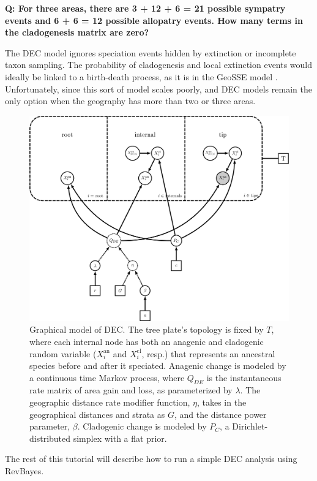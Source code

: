 {\bf Q: For three areas, there are 3 + 12 + 6 = 21 possible sympatry events and 6 + 6 = 12 possible allopatry events. How many terms in the cladogenesis matrix are zero?}

The DEC model ignores speciation events hidden by extinction or incomplete taxon sampling.
The probability of cladogenesis and local extinction events would ideally be linked to a birth-death process, as it is in the GeoSSE model \citep{goldberg11}.
Unfortunately, since this sort of model scales poorly, and DEC models remain the only option when the geography has more than two or three areas.


\begin{figure}[H]
\centering
\includegraphics[width=5in]{figures/bg_dec_dag}
\caption{Graphical model of DEC. The tree plate's topology is fixed by $T$, where each internal node has both an anagenic and cladogenic random variable ($X_i^{\text{an}}$ and $X_i^{\text{cl}}$, resp.) that represents an ancestral species before and after it speciated. Anagenic change is modeled by a continuous time Markov process, where $Q_{DE}$ is the instantaneous rate matrix of area gain and loss, as parameterized by $\lambda$. The geographic distance rate modifier function, $\eta$, takes in the geographical distances and strata as $G$, and the distance power parameter, $\beta$. Cladogenic change is modeled by $P_C$, a Dirichlet-distributed simplex with a flat prior.}
\end{figure}

The rest of this tutorial will describe how to run a simple DEC analysis using RevBayes.

\newpage







